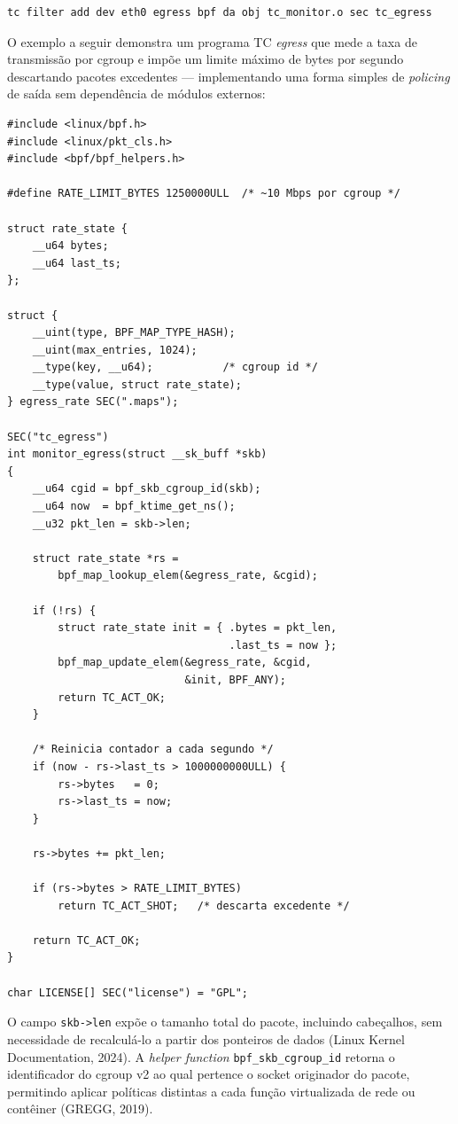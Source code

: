 \begin{lstlisting}[caption={Anexação de programa eBPF no egress TC.}, label=lst:tc-egress-setup]
tc filter add dev eth0 egress bpf da obj tc_monitor.o sec tc_egress
\end{lstlisting}

O exemplo a seguir demonstra um programa TC \textit{egress} que mede a taxa de
transmissão por cgroup e impõe um limite máximo de bytes por segundo descartando
pacotes excedentes — implementando uma forma simples de \textit{policing} de saída sem
dependência de módulos externos:

\begin{lstlisting}[caption={Programa TC egress com monitoramento de bytes por cgroup.}, label=lst:tc-egress-prog]
#include <linux/bpf.h>
#include <linux/pkt_cls.h>
#include <bpf/bpf_helpers.h>

#define RATE_LIMIT_BYTES 1250000ULL  /* ~10 Mbps por cgroup */

struct rate_state {
    __u64 bytes;
    __u64 last_ts;
};

struct {
    __uint(type, BPF_MAP_TYPE_HASH);
    __uint(max_entries, 1024);
    __type(key, __u64);           /* cgroup id */
    __type(value, struct rate_state);
} egress_rate SEC(".maps");

SEC("tc_egress")
int monitor_egress(struct __sk_buff *skb)
{
    __u64 cgid = bpf_skb_cgroup_id(skb);
    __u64 now  = bpf_ktime_get_ns();
    __u32 pkt_len = skb->len;

    struct rate_state *rs =
        bpf_map_lookup_elem(&egress_rate, &cgid);

    if (!rs) {
        struct rate_state init = { .bytes = pkt_len,
                                   .last_ts = now };
        bpf_map_update_elem(&egress_rate, &cgid,
                            &init, BPF_ANY);
        return TC_ACT_OK;
    }

    /* Reinicia contador a cada segundo */
    if (now - rs->last_ts > 1000000000ULL) {
        rs->bytes   = 0;
        rs->last_ts = now;
    }

    rs->bytes += pkt_len;

    if (rs->bytes > RATE_LIMIT_BYTES)
        return TC_ACT_SHOT;   /* descarta excedente */

    return TC_ACT_OK;
}

char LICENSE[] SEC("license") = "GPL";
\end{lstlisting}

O campo \texttt{skb->len} expõe o tamanho total do pacote, incluindo cabeçalhos, sem
necessidade de recalculá-lo a partir dos ponteiros de dados (Linux Kernel Documentation,
2024). A \textit{helper function} \texttt{bpf\_skb\_cgroup\_id} retorna o identificador do
cgroup v2 ao qual pertence o socket originador do pacote, permitindo aplicar políticas
distintas a cada função virtualizada de rede ou contêiner (GREGG, 2019).

